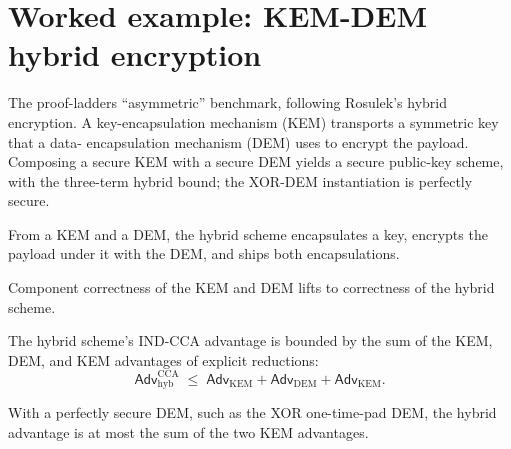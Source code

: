 \chapter{Worked example: KEM-DEM hybrid encryption}

The proof-ladders ``asymmetric'' benchmark, following Rosulek's hybrid encryption.
A key-encapsulation mechanism (KEM) transports a symmetric key that a data-
encapsulation mechanism (DEM) uses to encrypt the payload. Composing a secure KEM
with a secure DEM yields a secure public-key scheme, with the three-term hybrid
bound; the XOR-DEM instantiation is perfectly secure.

\begin{definition}
  \label{def:hybridpke}
  \leanok
  From a KEM and a DEM, the hybrid scheme encapsulates a key, encrypts the payload
  under it with the DEM, and ships both encapsulations.
\end{definition}

\begin{theorem}
  \label{thm:hybridpke-correct}
  \leanok
  Component correctness of the KEM and DEM lifts to correctness of the hybrid
  scheme.
\end{theorem}

\begin{theorem}
  \label{thm:kemdem-bound}
  \leanok
  The hybrid scheme's IND-CCA advantage is bounded by the sum of the KEM, DEM, and
  KEM advantages of explicit reductions:
  \[
    \mathsf{Adv}^{\mathrm{CCA}}_{\mathrm{hyb}} \;\le\; \mathsf{Adv}_{\mathrm{KEM}}
    + \mathsf{Adv}_{\mathrm{DEM}} + \mathsf{Adv}_{\mathrm{KEM}}.
  \]
\end{theorem}

\begin{theorem}
  \label{thm:kemdem-perfect}
  \leanok
  With a perfectly secure DEM, such as the XOR one-time-pad DEM, the hybrid
  advantage is at most the sum of the two KEM advantages.
\end{theorem}
